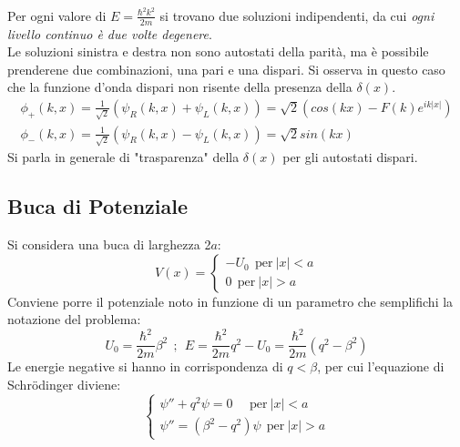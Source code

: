 \documentclass[twoside]{article}
\begin{document}
\\
Per ogni valore di $E=\frac{\hbar^2 k^2}{2m}$ si trovano due soluzioni indipendenti, da cui \textit{ogni livello continuo è due volte degenere}.
\\
Le soluzioni sinistra e destra non sono autostati della parità, ma è possibile prenderene due combinazioni, una pari e una dispari.
Si osserva in questo caso che la funzione d'onda dispari non risente della presenza della $\delta (x)$.
\begin{equation}
    \begin{split}
        \phi_{+}(k,x)=\frac{1}{\sqrt{2}}(\psi_R (k,x) + \psi_L (k,x))=\sqrt{2}(cos(kx)-F(k)e^{ik|x|}) \\
        \phi_{-} (k,x)=\frac{1}{\sqrt{2}}(\psi_R (k,x) - \psi_L (k,x))=\sqrt{2}sin(kx)
    \end{split}
\end{equation}
Si parla in generale di "trasparenza" della $\delta(x)$ per gli autostati dispari.

\vspace{0.5cm}

\subsection{Buca di Potenziale}
Si considera una buca di larghezza 2$a$:
\begin{equation}
    V(x)=\left \{ \begin{array}{rl}
            -U_0 \ \ \text{per} \ |x|<a\\
         0 \ \ \text{per} \ |x|>a
        \end{array}
    \right. 
\end{equation}
Conviene porre il potenziale noto in funzione di un parametro che semplifichi la notazione del problema:
\begin{equation}
    U_0=\frac{\hbar^2}{2m}\beta^2 \ \ ; \ \ E=\frac{\hbar^2}{2m}q^2 - U_0=\frac{\hbar^2}{2m}(q^2 - \beta^2)
\end{equation}
Le energie negative si hanno in corrispondenza di $q < \beta$, per cui l'equazione di Schr\"odinger diviene:
\begin{equation}
    \left \{ \begin{array}{lr}
           \psi''+q^2 \psi=0 \ \ \ \ \ \ \text{per} \ |x|<a \\
         \psi''=(\beta^2 - q^2)\psi \ \ \text{per} \ |x|>a
        \end{array}
    \right.
\end{equation}
\end{document}
